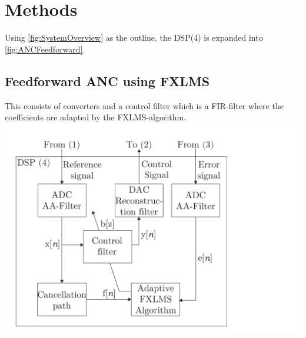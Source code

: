 \section{Methods}

Using \autoref{fig:SystemOverview} as the outline, the DSP(4) is expanded into \autoref{fig:ANCFeedforward}.




\subsection{Feedforward ANC using FXLMS}
This consists of converters and a control filter which is a FIR-filter where the coefficients are adapted by the FXLMS-algorithm. 
{
	\includegraphics[width=1\columnwidth]{figures/ArticleIllustrations/ANCFeedForward}
	\label{fig:ANCFeedforward}
}



